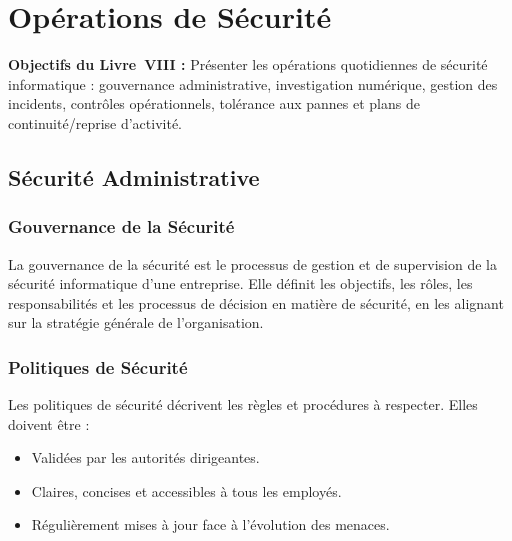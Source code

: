 
\chapter{Opérations de Sécurité}
\label{chap:operations}

\begin{boxobjectifs}
\textbf{Objectifs du Livre~VIII :} Présenter les opérations quotidiennes de sécurité informatique : gouvernance administrative, investigation numérique, gestion des incidents, contrôles opérationnels, tolérance aux pannes et plans de continuité/reprise d'activité.
\end{boxobjectifs}

\section{Sécurité Administrative}

\subsection{Gouvernance de la Sécurité}
La gouvernance de la sécurité est le processus de gestion et de supervision de la sécurité informatique d'une entreprise. Elle définit les objectifs, les rôles, les responsabilités et les processus de décision en matière de sécurité, en les alignant sur la stratégie générale de l'organisation.

\subsection{Politiques de Sécurité}
Les politiques de sécurité décrivent les règles et procédures à respecter. Elles doivent être :
\begin{itemize}
    \item Validées par les autorités dirigeantes.
    \item Claires, concises et accessibles à tous les employés.
    \item Régulièrement mises à jour face à l'évolution des menaces.
\end{itemize}

